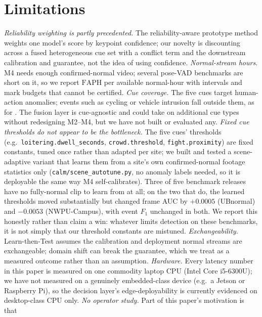 \documentclass[conference]{IEEEtran}
\newcommand{\faph}{\mathrm{FAPH}}
\begin{document}
\section{Limitations}
\label{sec:limits}

\emph{Reliability weighting is partly precedented.} The reliability-aware
prototype method \cite{reliabilityproto2026} weights one model's score by
keypoint confidence; our novelty is discounting
across a fused heterogeneous cue set with a conflict term and the downstream
calibration and guarantee, not the idea of using confidence.
\emph{Normal-stream hours.} M4 needs enough confirmed-normal video; several
pose-VAD benchmarks are short on it, so we report $\faph$ per available
normal-hour with intervals and mark budgets that cannot be certified.
\emph{Cue coverage.} The five cues target human-action anomalies; events such
as cycling or vehicle intrusion fall outside them, as for
\cite{yoloposeclip2026}. The fusion layer is cue-agnostic and could take on
additional cue types without redesigning M2--M4, but we have not built or
evaluated any.
\emph{Fixed cue thresholds do not appear to be the bottleneck.} The five
cues' thresholds (e.g.\ \texttt{loitering.dwell\_seconds},
\texttt{crowd.threshold}, \texttt{fight.proximity}) are fixed constants,
tuned once rather than adapted per site; we built and tested a
scene-adaptive variant that learns them from a site's own confirmed-normal
footage statistics only (\texttt{calm/scene\_autotune.py}, no anomaly
labels needed, so it is deployable the same way M4 self-calibrates). Three
of five benchmark releases have no fully-normal clip to learn from at all;
on the two that do, the learned thresholds moved substantially but changed
frame AUC by $+0.0005$ (UBnormal) and $-0.0053$ (NWPU-Campus), with event
$F_1$ unchanged in both. We report this honestly rather than claim a win:
whatever limits detection on these benchmarks, it is not simply that our
threshold constants are mistuned.
\emph{Exchangeability.} Learn-then-Test assumes the calibration and deployment
normal streams are exchangeable; domain shift can break the guarantee, which
we treat as a measured outcome rather than an assumption.
\emph{Hardware.} Every latency number in this paper is measured on one
commodity laptop CPU (Intel Core i5-6300U); we have not measured on a
genuinely embedded-class device (e.g.\ a Jetson or Raspberry Pi), so the
decision layer's edge-deployability is currently evidenced on desktop-class
CPU only.
\emph{No operator study.} Part of this paper's motivation is that
\end{document}
